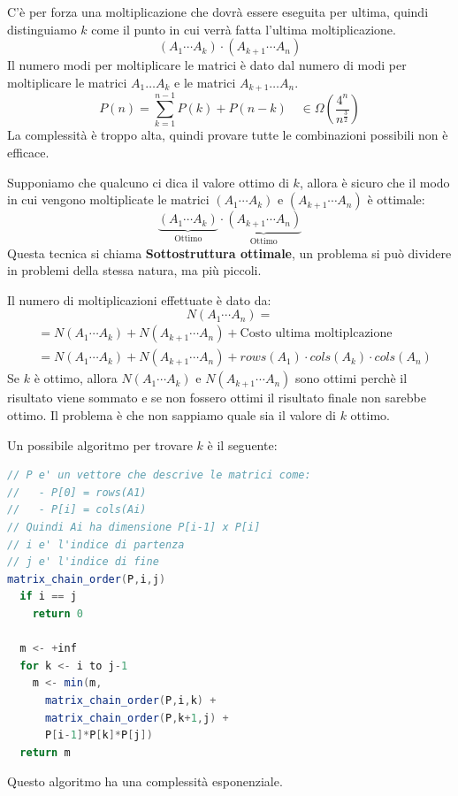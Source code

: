 \documentclass[a4paper]{article}
\begin{document}
C'è per forza una moltiplicazione che dovrà essere eseguita per ultima, quindi
distinguiamo \( k \) come il punto in cui verrà fatta l'ultima moltiplicazione.
\[
  (A_1 \cdots A_k) \cdot (A_{k+1} \cdots A_n)
\] 
Il numero modi per moltiplicare le matrici è dato dal numero di modi per moltiplicare
le matrici \( A_1 \dots A_k \) e le matrici \( A_{k+1} \dots A_n \).
\[
  P(n) = \sum_{k=1}^{n-1} P(k) + P(n-k) \quad \in \Omega \left( \frac{4^n}{n^{\frac{3}{2}}} \right) 
\] 
La complessità è troppo alta, quindi provare tutte le combinazioni possibili non è
efficace.

\vspace{1em}
\noindent
Supponiamo che qualcuno ci dica il valore ottimo di \( k \), allora è sicuro che
il modo in cui vengono moltiplicate le matrici \( (A_1 \cdots A_k) \) e 
\( (A_{k+1} \cdots A_n) \) è ottimale:
\[
  \underbrace{\left( A_1 \cdots A_k \right)}_{\text{Ottimo}} \cdot 
  \underbrace{\left( A_{k+1} \cdots A_n \right)}_{\text{Ottimo}}
\] 
Questa tecnica si chiama \textbf{Sottostruttura ottimale}, un problema si può dividere in
problemi della stessa natura, ma più piccoli.

\vspace{1em}
\noindent
Il numero di moltiplicazioni effettuate è dato da:
\[
  N\left( A_1 \cdots A_n \right) =
\] 
\[
  \begin{aligned}
         &= N\left( A_1 \cdots A_k \right) +
         N\left( A_{k+1} \cdots A_n \right) +
         \text{Costo ultima moltiplcazione}
         \\
         &= N\left( A_1 \cdots A_k \right) +
         N\left( A_{k+1} \cdots A_n \right) +
         rows(A_1) \cdot cols(A_k) \cdot cols(A_n)
  \end{aligned}
\] 
Se \( k \) è ottimo, allora \( N\left( A_1 \cdots A_k \right) \) e
\( N\left( A_{k+1} \cdots A_n \right) \) sono ottimi perchè il risultato
viene sommato e se non fossero ottimi il risultato finale non sarebbe ottimo.
Il problema è che non sappiamo quale sia il valore di \( k \) ottimo.

\vspace{1em}
\noindent
Un possibile algoritmo per trovare \( k \) è il seguente:
\begin{lstlisting}[language=Scala]
// P e' un vettore che descrive le matrici come:
//   - P[0] = rows(A1)
//   - P[i] = cols(Ai)
// Quindi Ai ha dimensione P[i-1] x P[i]
// i e' l'indice di partenza
// j e' l'indice di fine
matrix_chain_order(P,i,j)
  if i == j
    return 0

  m <- +inf
  for k <- i to j-1
    m <- min(m,
      matrix_chain_order(P,i,k) +
      matrix_chain_order(P,k+1,j) +
      P[i-1]*P[k]*P[j])
  return m
\end{lstlisting}
Questo algoritmo ha una complessità esponenziale.
\end{document}
